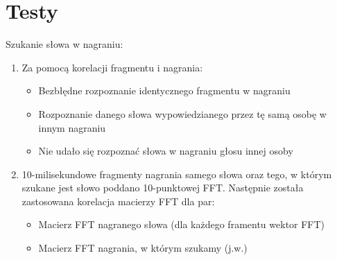 \section{Testy}
Szukanie słowa w nagraniu:
\\
\begin{enumerate}
\item 
{
	Za pomocą korelacji fragmentu i nagrania:
	\begin{itemize}
		\item Bezbłędne rozpoznanie identycznego fragmentu w nagraniu
		\item Rozpoznanie danego słowa wypowiedzianego przez tę samą osobę w innym nagraniu
		\item Nie udało się rozpoznać słowa w nagraniu głosu innej osoby
	\end{itemize}
}

\item
{
	10-milisekundowe fragmenty nagrania samego słowa oraz tego, w którym szukane jest słowo poddano 10-punktowej FFT. Następnie została zastosowana korelacja macierzy FFT dla par: 
	\begin{itemize}
		\item Macierz FFT nagranego słowa (dla każdego framentu wektor FFT)
		\item Macierz FFT nagrania, w którym szukamy (j.w.)
	\end{itemize}
}
\end{enumerate}